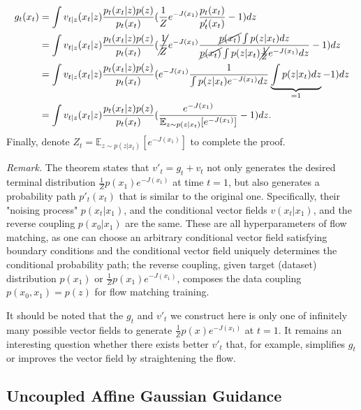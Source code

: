 \begin{align}
    \nonumber g_t(x_t) & = \int v_{t|z}(x_t|z) \frac{p_t(x_t|z)p(z)}{p_t(x_t)} (\frac{1}{Z}e^{-J(x_1)}\frac{p_t(x_t)}{p'_t(x_t)} - 1) dz \\ 
    \nonumber& = \int v_{t|z}(x_t|z) \frac{p_t(x_t|z)p(z)}{p_t(x_t)} (\cancel{\frac{1}{Z}}e^{-J(x_1)}\frac{\cancel{p(x_t)} \int p(z|x_t)dz}{\cancel{p(x_t)} \int p(z|x_t) \cancel{\frac{1}{Z}} e^{-J(x_1)}dz} - 1) dz \\ 
    \nonumber& = \int v_{t|z}(x_t|z) \frac{p_t(x_t|z)p(z)}{p_t(x_t)} (e^{-J(x_1)}\frac{1}{\int p(z|x_t) e^{-J(x_1)}dz}\underbrace{\int p(z|x_t)dz}_{=1} - 1) dz \\ 
    & = \int v_{t|z}(x_t|z) \frac{p_t(x_t|z)p(z)}{p_t(x_t)} (\frac{e^{-J(x_1)}}{\mathbb{E}_{z\sim p(z|x_t)}[e^{-J(x_1)}]} - 1) dz. 
\end{align}
Finally, denote $Z_t = \mathbb{E}_{z\sim p(z|x_t)}[e^{-J(x_1)}]$ to complete the proof.

\textit{Remark.} The theorem states that $v'_t = g_t + v_t$ not only generates the desired terminal distribution $\frac{1}{Z}p(x_1)e^{-J(x_1)}$ at time $t=1$, but also generates a probability path $p'_t(x_t)$ that is similar to the original one. Specifically, their "noising process" $p(x_t|x_1)$, and the conditional vector fields $v(x_t|x_1)$, and the reverse coupling $p(x_0|x_1)$ are the same. These are all hyperparameters of flow matching, as one can choose an arbitrary conditional vector field satisfying boundary conditions and the conditional vector field uniquely determines the conditional probability path; the reverse coupling, given target (dataset) distribution $p(x_1)$ or $\frac{1}{Z}p(x_1)e^{-J(x_1)}$, composes the data coupling $p(x_0,x_1) = p(z)$ for flow matching training.

It should be noted that the $g_t$ and $v'_t$ we construct here is only one of infinitely many \citep{lipman_flow_2023} possible vector fields to generate $\frac{1}{Z}p(x)e^{-J(x_1)}$ at $t=1$. It remains an interesting question whether there exists better $v'_t$ that, for example, simplifies $g_t$ or improves the vector field by straightening the flow.



\subsection{Uncoupled Affine Gaussian Guidance}
\label{app:affine_gaussian_guidance_matching}

